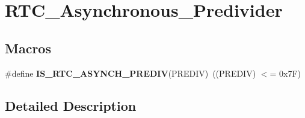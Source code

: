 \hypertarget{group___r_t_c___asynchronous___predivider}{\section{R\-T\-C\-\_\-\-Asynchronous\-\_\-\-Predivider}
\label{group___r_t_c___asynchronous___predivider}
}
\subsection*{Macros}
\begin{DoxyCompactItemize}
\item 
\hypertarget{group___r_t_c___asynchronous___predivider_gac20f6c94ede2d474df8ba4acb7328d93}{\#define {\bfseries I\-S\-\_\-\-R\-T\-C\-\_\-\-A\-S\-Y\-N\-C\-H\-\_\-\-P\-R\-E\-D\-I\-V}(P\-R\-E\-D\-I\-V)~((P\-R\-E\-D\-I\-V) $<$= 0x7\-F)}\label{group___r_t_c___asynchronous___predivider_gac20f6c94ede2d474df8ba4acb7328d93}

\end{DoxyCompactItemize}


\subsection{Detailed Description}
